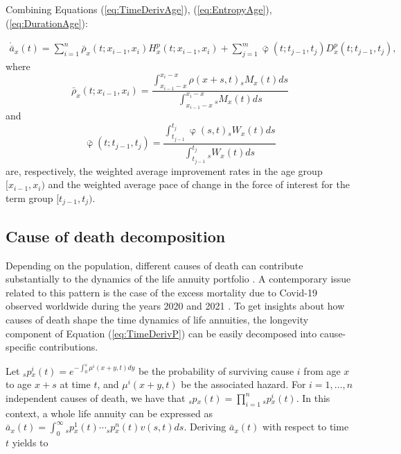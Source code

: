 \documentclass[12pt]{article}
\begin{document}
Combining Equations (\ref{eq:TimeDerivAge}), (\ref{eq:EntropyAge}), (\ref{eq:DurationAge}):  

\begin{equation}\label{eq:TimeDerivAge2}
\begin{split}
 \acute{\bar{a}}_x(t) = \sum_{i=1}^n\bar{\rho}_x(t;x_{i-1}, x_i){H}^{p}_x(t;x_{i-1}, x_i) +\sum_{j=1}^m\bar{\upvarphi}(t;t_{j-1},t_{j}){D}^{p}_x(t;t_{j-1},t_{j}),  
\end{split}
\end{equation}
where $$\bar{\rho}_x(t;x_{i-1}, x_i)= \frac{\int_{x_{i-1}-x}^{x_i-x} \rho(x+s,t) {}_sM_x(t)  ds}{\int_{x_{i-1}-x}^{x_i-x}  {}_sM_x(t)ds}$$ and 
$$\bar{\upvarphi}(t;t_{j-1},t_{j})= \frac{\int_{t_{j-1}}^{t_{j}} \upvarphi(s,t) {}_sW_x(t)  ds}{\int_{t_{j-1}}^{t_{j}} {}_sW_x(t) ds}$$ are, respectively, the weighted average improvement rates in the age group $[x_{i-1},x_{i})$ and the weighted average pace of change in the force of interest for the term group $[t_{j-1},t_{j})$. 





\subsection{Cause of death decomposition}

Depending on the population, different causes of death can contribute substantially to the dynamics of the life annuity portfolio \citep{lin2005securitization,kallestrup2020insight}. A contemporary issue related to this pattern is the case of the excess mortality due to Covid-19 observed worldwide during the years 2020 and 2021 \citep{aburto2022quantifying}. To get insights about how causes of death shape the time dynamics of life annuities, the longevity component of Equation (\ref{eq:TimeDerivP}) can be easily decomposed into cause-specific contributions. 

Let ${_s}p{^i_x}(t)=e^{-\int_{0}^{s}\mu{^i}(x+y,t)dy}$ be the probability of surviving cause $i$ from age \(x\) to age \(x+s\) at time $t$, and $\mu{^i}(x+y,t)$ be the associated hazard. For $i=1,\dots,n$ independent causes of death, we have that ${_s}p{_x}(t)= \prod_{i=1}^{n} {_s}p{^i_x}(t)$. In this context, a whole life annuity can be expressed as $\bar{a}_x(t) = \int_0^\infty {_s}p{^1_x}(t) \cdots{_s}p{^n_x}(t) {v}(s,t)ds$. Deriving $\bar{a}_x(t)$ with respect to time $t$ yields to
\end{document}
